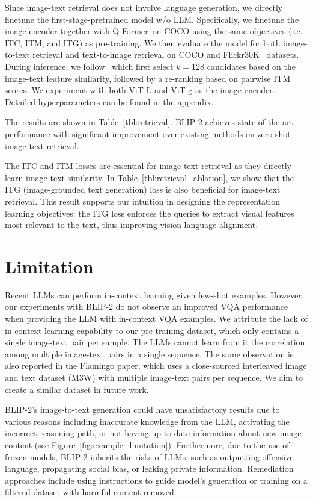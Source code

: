 Since image-text retrieval does not involve language generation, we directly finetune the first-stage-pretrained model w/o LLM. Specifically, we finetune the image encoder together with Q-Former~on COCO using the same objectives (i.e. ITC, ITM, and ITG) as pre-training. We then evaluate the model for both image-to-text retrieval and text-to-image retrieval on COCO and Flickr30K~\cite{flickr} datasets. During inference, we follow~\citet{ALBEF,blip} which first select $k=128$ candidates based on the image-text feature similarity, followed by a re-ranking based on pairwise ITM scores. We experiment with both ViT-L and ViT-g as the image encoder. Detailed hyperparameters can be found in the appendix.

The results are shown in Table~\ref{tbl:retrieval}.
BLIP-2 achieves state-of-the-art performance with significant improvement over existing methods on zero-shot image-text retrieval.

The ITC and ITM losses are essential for image-text retrieval as they directly learn image-text similarity. In Table~\ref{tbl:retrieval_ablation},
we show that the ITG (image-grounded text generation) loss is also beneficial for image-text retrieval. This result supports our intuition in designing the representation learning objectives: the ITG loss enforces the queries to extract visual features most relevant to the text, thus improving vision-language alignment. 

\section{Limitation}
\label{sec:limitation}

Recent LLMs can perform in-context learning given few-shot examples. However, our experiments with BLIP-2 do not observe an improved VQA performance when providing the LLM with in-context VQA examples. We attribute the lack of in-context learning capability to our pre-training dataset, which only contains a single image-text pair per sample. The LLMs cannot learn from it the correlation among multiple image-text pairs in a single sequence. The same observation is also reported in the Flamingo paper, which uses a close-sourced interleaved image and text dataset (M3W) with multiple image-text pairs per sequence. We aim to create a similar dataset in future work.

BLIP-2's image-to-text generation could have unsatisfactory results due to various reasons including inaccurate knowledge from the LLM, activating the incorrect reasoning path, or not having up-to-date information about new image content (see Figure~\ref{fig:example_limitation}).
Furthermore,
due to the use of frozen models, BLIP-2 inherits the risks of LLMs, such as outputting offensive language, propagating social bias, or leaking private information. Remediation approaches include using instructions to guide model's generation or training on a filtered dataset with harmful content removed.

